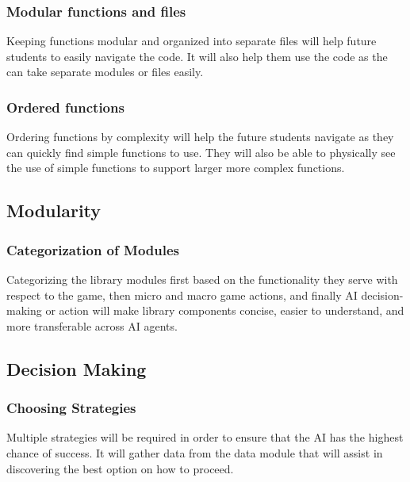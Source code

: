 \documentclass[10pt,letterpaper,onecolumn,draftclsnofoot]{IEEEtran}
\begin{document}
\subsubsection{Modular functions and files}
	Keeping functions modular and organized into separate files will help future students to easily navigate the code. It will also help them use the code as the can take separate modules or files easily.

\subsubsection{Ordered functions}
	Ordering functions by complexity will help the future students navigate as they can quickly find simple functions to use. They will also be able to physically see the use of simple functions to support larger more complex functions.
\subsection{Modularity}
\subsubsection{Categorization of Modules}
	Categorizing the library modules first based on the functionality they serve with respect to the game, then micro and macro game actions, and finally AI decision-making or action will make library components concise, easier to understand, and more transferable across AI agents.
\subsection{Decision Making}
\subsubsection{Choosing Strategies}
	Multiple strategies will be required in order to ensure that the AI has the highest chance of success. It will gather data from the data module that will assist in discovering the best option on how to proceed. 
\end{document}
